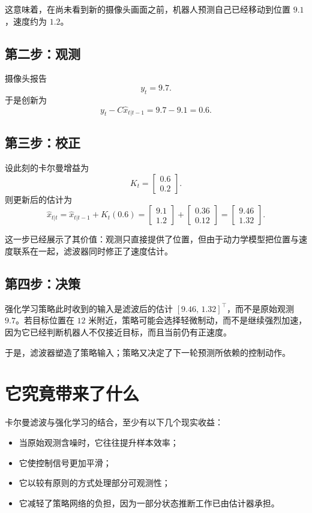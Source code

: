 \documentclass[12pt,a4paper]{ctexart}
\begin{document}
这意味着，在尚未看到新的摄像头画面之前，机器人预测自己已经移动到位置 \(9.1\)，速度约为 \(1.2\)。

\subsection{第二步：观测}

摄像头报告
\[
y_t = 9.7.
\]
于是创新为
\[
y_t - C\hat{x}_{t|t-1} = 9.7 - 9.1 = 0.6.
\]

\subsection{第三步：校正}

设此刻的卡尔曼增益为
\[
K_t =
\begin{bmatrix}
0.6\\
0.2
\end{bmatrix}.
\]
则更新后的估计为
\[
\hat{x}_{t|t}
=
\hat{x}_{t|t-1} + K_t(0.6)
=
\begin{bmatrix}
9.1\\
1.2
\end{bmatrix}
+
\begin{bmatrix}
0.36\\
0.12
\end{bmatrix}
=
\begin{bmatrix}
9.46\\
1.32
\end{bmatrix}.
\]

这一步已经展示了其价值：观测只直接提供了位置，但由于动力学模型把位置与速度联系在一起，滤波器同时修正了速度估计。

\subsection{第四步：决策}

强化学习策略此时收到的输入是滤波后的估计 \([9.46,\,1.32]^\top\)，而不是原始观测 \(9.7\)。若目标位置在 \(12\) 米附近，策略可能会选择轻微制动，而不是继续强烈加速，因为它已经判断机器人不仅接近目标，而且当前仍有正速度。

于是，滤波器塑造了策略输入；策略又决定了下一轮预测所依赖的控制动作。

\section{它究竟带来了什么}

卡尔曼滤波与强化学习的结合，至少有以下几个现实收益：
\begin{itemize}
  \item 当原始观测含噪时，它往往提升样本效率；
  \item 它使控制信号更加平滑；
  \item 它以较有原则的方式处理部分可观测性；
  \item 它减轻了策略网络的负担，因为一部分状态推断工作已由估计器承担。
\end{itemize}
\end{document}
